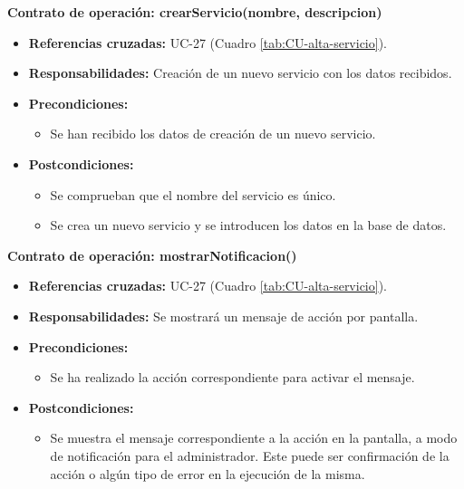\textbf{Contrato de operación: crearServicio(nombre, descripcion)}
\begin{itemize}
\item \textbf{Referencias cruzadas:} UC-27 (Cuadro \ref{tab:CU-alta-servicio}).
\item \textbf{Responsabilidades:} Creación de un nuevo servicio con los datos recibidos.
\item \textbf{Precondiciones:} 
 \begin{itemize}
\item Se han recibido los datos de creación de un nuevo servicio.
\end {itemize}
\item \textbf{Postcondiciones:} 
 \begin{itemize}
 \item Se comprueban que el nombre del servicio es único.
\item Se crea un nuevo servicio y se introducen los datos en la base de datos.
\end {itemize}
\end {itemize}

\textbf{Contrato de operación: mostrarNotificacion()}
\begin{itemize}
\item \textbf{Referencias cruzadas:} UC-27 (Cuadro \ref{tab:CU-alta-servicio}).
\item \textbf{Responsabilidades:} Se mostrará un mensaje de acción por pantalla.
\item \textbf{Precondiciones:} 
 \begin{itemize}
\item Se ha realizado la acción correspondiente para activar el mensaje.
\end {itemize}
\item \textbf{Postcondiciones:} 
 \begin{itemize}
\item Se muestra el mensaje correspondiente a la acción en la pantalla, a modo de notificación para el administrador. Este puede ser confirmación de la acción o algún tipo de error en la ejecución de la misma.
\end {itemize}
\end {itemize}


\vspace{10mm}

